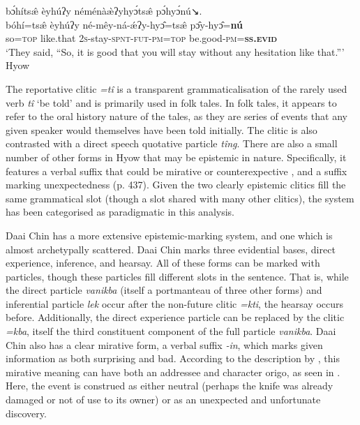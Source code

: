 \begin{exe}
\ex\label{e:History:Hyow}
\glll bɔ́hítsæ̂ èyhúʔy néménàæ̀ʔyhyɔ́tsæ̂ pɔ́hyɔ́nú↘. \\
bóhí=tsæ̂ èyhúʔy né-mêy-ná-ǽʔy-hyɔ̂=tsæ̂ pɔ̂y-hyɔ̂=\textbf{nú} \\
so=\textsc{top} like.that \textsc{2s}-stay-\textsc{spnt-fut-pm=top} be.good\textsc{-pm=\textbf{ss.evid}} \\
\glt `They said, ``So, it is good that you will stay without any hesitation like that.''' Hyow \cite[Kukish: Myanmar,][487]{Zakaria2018}
\end{exe}

The reportative clitic \textit{=tî} is a transparent grammaticalisation of the rarely used verb \textit{tî} `be told' and is primarily used in folk tales. In folk tales, it appears to refer to the oral history nature of the tales, as they are series of events that any given speaker would themselves have been told initially. The clitic is also contrasted with a direct speech quotative particle \textit{tîng}. There are also a small number of other forms in Hyow that may be epistemic in nature. Specifically, it features a verbal suffix that could be mirative or counterexpective \cite[440]{Zakaria2018}, and a suffix marking unexpectedness (p. 437). Given the two clearly epistemic clitics fill the same grammatical slot (though a slot shared with many other clitics), the system has been categorised as paradigmatic in this analysis.

Daai Chin \cite[Kukish: Myanmar,][294]{SoHartmann2009} has a more extensive epistemic-marking system, and one which is almost archetypally scattered. Daai Chin marks three evidential bases, direct experience, inference, and hearsay. All of these forms can be marked with particles, though these particles fill different slots in the sentence. That is, while the direct particle \textit{vanikba} (itself a portmanteau of three other forms) and inferential particle \textit{lek} occur after the non-future clitic \textit{=kti}, the hearsay occurs before. Additionally, the direct experience particle can be replaced by the clitic \textit{=kba}, itself the third constituent component of the full particle \textit{vanikba}. Daai Chin also has a clear mirative form, a verbal suffix \textit{-in}, which marks given information as both surprising and bad. According to the description by , this mirative meaning can have both an addressee and character origo, as seen in . Here, the event is construed as either neutral (perhaps the knife was already damaged or not of use to its owner) or as an unexpected and unfortunate discovery.

